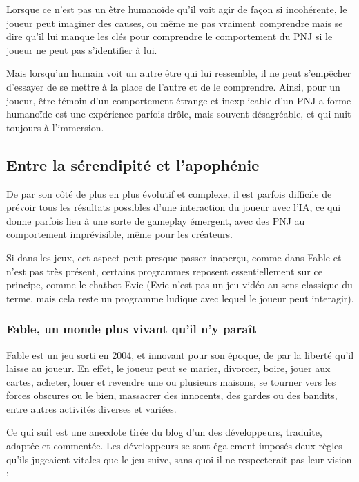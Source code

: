 \documentclass[a4paper, 12pt]{article} %
\begin{document}
Lorsque ce n’est pas un être humanoïde qu’il voit agir de façon si incohérente, le joueur peut imaginer des causes, ou même ne pas vraiment comprendre mais se dire qu’il lui manque les clés pour comprendre le comportement du PNJ si le joueur ne peut pas s’identifier à lui. 

Mais lorsqu’un humain voit un autre être qui lui ressemble, il ne peut s’empêcher d’essayer de se mettre à la place de l’autre et de le comprendre. Ainsi, pour un joueur, être témoin d’un comportement étrange et inexplicable d’un PNJ a forme humanoïde est une expérience parfois drôle, mais souvent désagréable, et qui nuit toujours à l’immersion.

\newpage
\subsection{Entre la sérendipité et l'apophénie}

De par son côté de plus en plus évolutif et complexe, il est parfois difficile de prévoir tous les résultats possibles d’une interaction du joueur avec l’IA, ce qui donne parfois lieu à une sorte de gameplay émergent, avec des PNJ au comportement imprévisible, même pour les créateurs.

Si dans les jeux, cet aspect peut presque passer inaperçu, comme dans Fable et n'est pas très présent, certains programmes reposent essentiellement sur ce principe, comme le chatbot Evie (Evie n'est pas un jeu vidéo au sens classique du terme, mais cela reste un programme ludique avec lequel le joueur peut interagir).

\newpage
\subsubsection{Fable, un monde plus vivant qu'il n'y paraît}

Fable est un jeu sorti en 2004, et innovant pour son époque, de par la liberté qu’il laisse au joueur. En effet, le joueur peut se marier, divorcer, boire, jouer aux cartes, acheter, louer et revendre une ou plusieurs maisons, se tourner vers les forces obscures ou le bien, massacrer des innocents, des gardes ou des bandits, entre autres activités diverses et variées.

Ce qui suit est une anecdote tirée du blog d’un des développeurs, traduite, adaptée et commentée.
Les développeurs se sont également imposés deux règles qu’ils jugeaient vitales que le jeu suive, sans quoi il ne respecterait pas leur vision :
\end{document}
